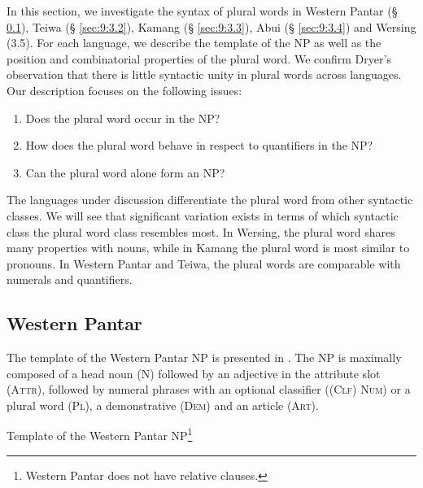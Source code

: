 In this section, we investigate the syntax of plural words in Western Pantar ({\S} \ref{sec:9:3.1}), Teiwa ({\S} \ref{sec:9:3.2}), Kamang ({\S} \ref{sec:9:3.3}), Abui ({\S} \ref{sec:9:3.4}) and Wersing (3.5). For each language, we describe the template of the NP as well as the position and combinatorial properties of the plural word. We confirm Dryer's observation that there is little syntactic unity in plural words across languages. Our description focuses on the following issues:

\begin{enumerate}
\item Does the plural word occur in the NP?
\item  How does the plural word behave in respect to quantifiers in the NP?
\item   Can the plural word alone form an NP?
\end{enumerate}

The languages under discussion differentiate the plural word from other syntactic classes. We will see that significant variation exists in terms of which syntactic class the plural word class resembles most. In Wersing, the plural word shares many properties with nouns, while in Kamang the plural word is most similar to pronouns. In Western Pantar and Teiwa, the plural words are comparable with numerals and quantifiers.

\subsection{Western Pantar}  %
\label{sec:9:3.1}
The template of the Western Pantar NP is presented in  \citep{Holtontawesternpantar}. The NP is maximally composed of a head noun (N) followed by an adjective in the attribute slot (\textsc{Attr),} followed by numeral phrases with an optional classifier (\textsc{(Clf)} \textsc{Num)} or a plural word (\textsc{Pl),} a demonstrative \textsc{(Dem)} and an article \textsc{(Art)}. 

\ea\label{ex:9:12}
\upshape
Template of the Western Pantar NP\footnote{Western Pantar does not have relative clauses.}

